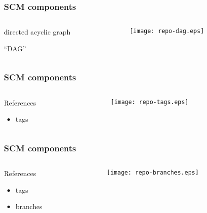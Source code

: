 \documentclass[english]{beamer}
\begin{document}
\begin{frame}
\frametitle{SCM components}
\begin{columns}[t]
        \begin{column}[T]{.5\textwidth}
                directed acyclic graph

                \vspace{.1\textheight}
                ``DAG''
        \end{column}
        \begin{column}[T]{.5\textwidth}
                \vspace{.2\textheight}
                \texttt{[image: repo-dag.eps]}
        \end{column}
\end{columns}

\end{frame}

\begin{frame}
\frametitle{SCM components}
\begin{columns}[t]
        \begin{column}[T]{.5\textwidth}
                References
                \begin{itemize}
                        \item tags
                \end{itemize}
        \end{column}
        \begin{column}[T]{.5\textwidth}
                \vspace{.2\textheight}
                \texttt{[image: repo-tags.eps]}
        \end{column}
\end{columns}

\end{frame}

\begin{frame}
\frametitle{SCM components}
\begin{columns}[t]
        \begin{column}[T]{.5\textwidth}
                References
                \begin{itemize}
                        \item tags
                        \item branches
                \end{itemize}
        \end{column}
        \begin{column}[T]{.5\textwidth}
                \vspace{.2\textheight}
                \texttt{[image: repo-branches.eps]}
        \end{column}
\end{columns}

\end{frame}
\end{document}
